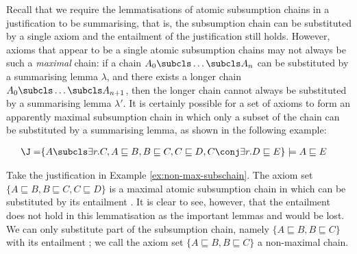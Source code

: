 Recall that we require the lemmatisations of atomic subsumption chains in a justification to be summarising, that is, the subsumption chain can be substituted by a single axiom and the entailment of the justification still holds. However, axioms that appear to be a single atomic subsumption chains may not always be such a \emph{maximal} chain: if a chain $A_{0} \subcls \ldots \subcls A_{n} $ can be substituted by a summarising lemma $\lambda$, and there exists a longer chain $A_{0} \subcls \ldots \subcls A_{n+1}$, then the longer chain cannot always be substituted by a summarising lemma $\lambda'$. It is certainly possible for a set of axioms to form an apparently maximal subsumption chain in which only a subset of the chain can be substituted by a summarising lemma, as shown in the following example: 
\begin{examp}
\label{ex:non-max-subschain}
\begin{align*}
\J = & \{A \subcls \exists r.C, A \sqsubseteq B, B \sqsubseteq C, C \sqsubseteq D, C \conj \exists r.D \sqsubseteq E \} \models A \sqsubseteq E
\end{align*}
\end{examp}

Take the justification \J in Example \ref{ex:non-max-subschain}. The axiom set $\{A \sqsubseteq B, B \sqsubseteq C, C \sqsubseteq D\}$ is a maximal atomic subsumption chain in \J which can be substituted by its entailment . It is clear to see, however, that the entailment does not hold in this lemmatisation as the important lemmas  and  would be lost. We can only substitute part of the subsumption chain, namely $\{A \sqsubseteq B, B \sqsubseteq C\}$ with its entailment ; we call the axiom set $\{A \sqsubseteq B, B \sqsubseteq C\}$ a non-maximal chain.

